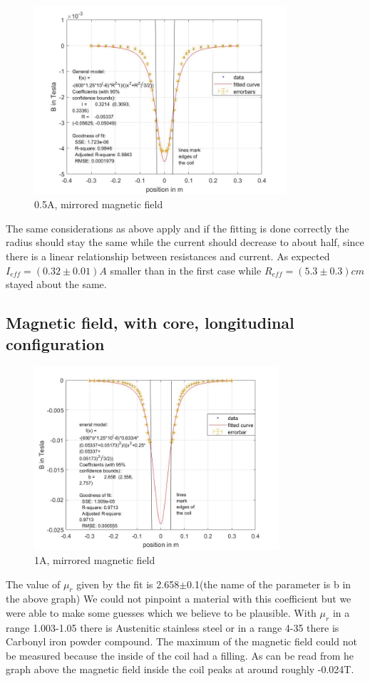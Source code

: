 \documentclass[12pt]{article}
\begin{document}
	\begin{figure}[H]
		\centering
		\includegraphics[height=7cm]{long 05A ohne Kern mit Spule.jpg}
		\caption{0.5A, mirrored magnetic field}
	\end{figure}
	The same considerations as above apply and if the fitting is done correctly the radius should stay the same while the current should decrease to about half, since there is a linear relationship between resistances and current. As expected $I_{eff}=(0.32\pm 0.01)A$ smaller than in the first case while $R_{eff}=(5.3\pm 0.3)cm$ stayed about the same.
	
	\subsection{Magnetic field, with core, longitudinal configuration}
	\begin{figure}[H]
		\centering
		\includegraphics[height=6.8cm]{long 1A mit kern mit Spule.jpg}
		\caption{1A, mirrored magnetic field}
	\end{figure}
	The value of $\mu_r$ given by the fit is 2.658$\pm$0.1(the name of the parameter is b in the above graph) We could not pinpoint a material with this coefficient but we were able to make some guesses which we believe to be plausible. With $\mu_r$  in a range 1.003-1.05 there is Austenitic stainless steel or in a range 4-35 there is Carbonyl iron powder compound.
	The maximum of the magnetic field could not be measured because the inside of the coil had a filling. As can be read from he graph above the magnetic field inside the coil peaks at around roughly -0.024T.
\end{document}
